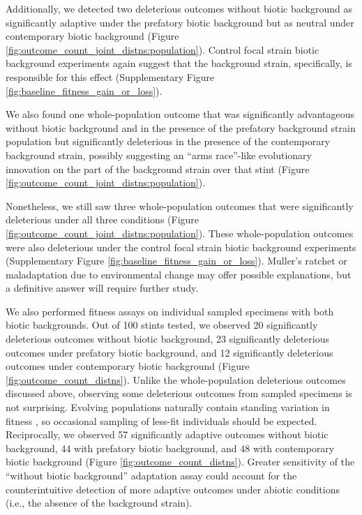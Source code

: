 Additionally, we detected two deleterious outcomes without biotic background as significantly adaptive under the prefatory biotic background but as neutral under contemporary biotic background (Figure \ref{fig:outcome_count_joint_distns:population}).
Control focal strain biotic background experiments again suggest that the background strain, specifically, is responsible for this effect (Supplementary Figure \ref{fig:baseline_fitness_gain_or_loss}).

We also found one whole-population outcome that was significantly advantageous without biotic background and in the presence of the prefatory background strain population but significantly deleterious in the presence of the contemporary background strain, possibly suggesting an ``arms race''-like evolutionary innovation on the part of the background strain over that stint (Figure \ref{fig:outcome_count_joint_distns:population}).

Nonetheless, we still saw three whole-population outcomes that were significantly deleterious under all three conditions (Figure \ref{fig:outcome_count_joint_distns:population}).
These whole-population outcomes were also deleterious under the control focal strain biotic background experiments (Supplementary Figure \ref{fig:baseline_fitness_gain_or_loss}).
Muller's ratchet \citep{andersson1996muller} or maladaptation due to environmental change \citep{brady2019causes} may offer possible explanations, but a definitive answer will require further study.

We also performed fitness assays on individual sampled specimens with both biotic backgrounds.
Out of 100 stints tested, we observed 20 significantly deleterious outcomes without biotic background, 23 significantly deleterious outcomes under prefatory biotic background, and 12 significantly deleterious outcomes under contemporary biotic background (Figure \ref{fig:outcome_count_distns}).
Unlike the whole-population deleterious outcomes discussed above, observing some deleterious outcomes from sampled specimens is not surprising.
Evolving populations naturally contain standing variation in fitness \citep{martin2016nonstationary}, so occasional sampling of less-fit individuals should be expected.
Reciprocally, we observed 57 significantly adaptive outcomes without biotic background, 44 with prefatory biotic background, and 48 with contemporary biotic background (Figure \ref{fig:outcome_count_distns}).
Greater sensitivity of the ``without biotic background'' adaptation assay could account for the counterintuitive detection of more adaptive outcomes under abiotic conditions (i.e., the absence of the background strain).

